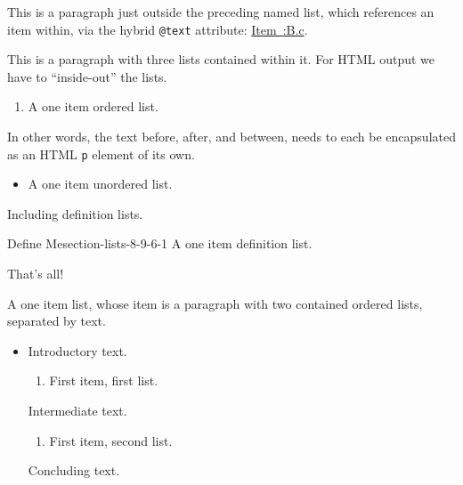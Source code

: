 \documentclass{amsart}
\theoremstyle{plain}%
\theoremstyle{definition}%
\theoremstyle{remark}%
\newcommand{\xreffont}{\relax}
\newcommand{\mono}[1]{\texttt{#1}}
\numberwithin{equation}{section}
\begin{document}
This is a paragraph just outside the preceding named list, which references an item within, via the hybrid \mono{@text} attribute:  \hyperlink{target-item}{Item~{\xreffont 12.4:B.c}}.%
\par
{}This is a paragraph with three lists contained within it.  For HTML output we have to ``inside-out'' the lists.%
\begin{enumerate}
\item{}A one item ordered list.%
\end{enumerate}
In other words, the text before, after, and between, needs to each be encapsulated as an HTML \mono{p} element of its own.%
\begin{itemize}[label=\textbullet]
\item{}A one item unordered list.%
\end{itemize}
Including definition lists.%
\begin{descriptionlist}
\begin{dlimedium}{Define Me}{section-lists-8-9-6-1}%
A one item definition list.%
\end{dlimedium}%
\end{descriptionlist}
That's all!%
\par
A one item list, whose item is a paragraph with two contained ordered lists, separated by text.%
\begin{itemize}[label=$\blacksquare$]
\item{}Introductory text.%
\begin{enumerate}[label={\Alph*}]
\item{}First item, first list.%
\end{enumerate}
Intermediate text.%
\begin{enumerate}[label={\alph*}]
\item{}First item, second list.%
\end{enumerate}
Concluding text.%
\end{itemize}
%
%
%
\typeout{************************************************}
\typeout{************************************************}
%
\end{document}

